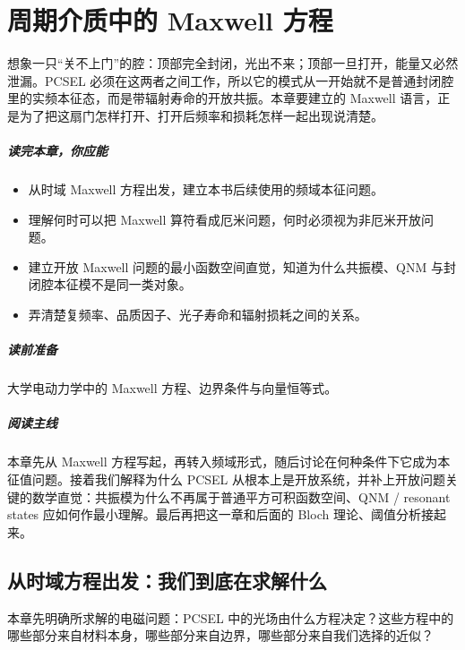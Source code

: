 ﻿%
\chapter{周期介质中的 Maxwell 方程}
\label{ch:maxwell}

想象一只“关不上门”的腔：顶部完全封闭，光出不来；顶部一旦打开，能量又必然泄漏。PCSEL 必须在这两者之间工作，所以它的模式从一开始就不是普通封闭腔里的实频本征态，而是带辐射寿命的开放共振。本章要建立的 Maxwell 语言，正是为了把这扇门怎样打开、打开后频率和损耗怎样一起出现说清楚。

\paragraph{读完本章，你应能}
\begin{itemize}
  \item 从时域 Maxwell 方程出发，建立本书后续使用的频域本征问题。
  \item 理解何时可以把 Maxwell 算符看成厄米问题，何时必须视为非厄米开放问题。
  \item 建立开放 Maxwell 问题的最小函数空间直觉，知道为什么共振模、QNM 与封闭腔本征模不是同一类对象。
  \item 弄清楚复频率、品质因子、光子寿命和辐射损耗之间的关系。
\end{itemize}

\paragraph{读前准备}
大学电动力学中的 Maxwell 方程、边界条件与向量恒等式。

\paragraph{阅读主线}
本章先从 Maxwell 方程写起，再转入频域形式，随后讨论在何种条件下它成为本征值问题。接着我们解释为什么 PCSEL 从根本上是开放系统，并补上开放问题关键的数学直觉：共振模为什么不再属于普通平方可积函数空间、QNM / resonant states 应如何作最小理解。最后再把这一章和后面的 Bloch 理论、阈值分析接起来。

\section{从时域方程出发：我们到底在求解什么}
本章先明确所求解的电磁问题：PCSEL 中的光场由什么方程决定？这些方程中的哪些部分来自材料本身，哪些部分来自边界，哪些部分来自我们选择的近似？

